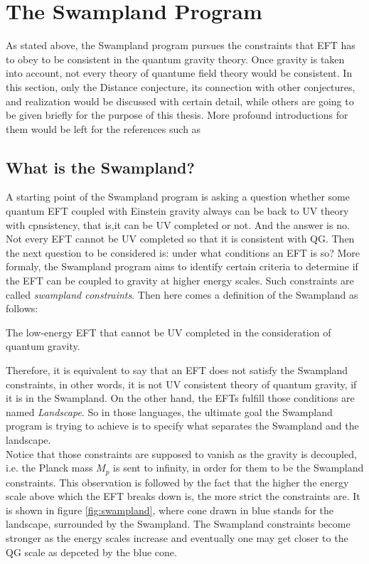 

\section{The Swampland Program}
As stated above, the Swampland program pursues the constraints that EFT has to obey to be consistent in the quantum gravity theory. Once gravity is taken into account, not every theory of quantume field theory would be consistent. In this section, only the Distance conjecture, its connection with other conjectures, and realization would be discussed with certain detail, while others are going to be given briefly for the purpose of this thesis. More profound introductions for them would be left for the references such as %

\subsection{What is the Swampland?}
A starting point of the Swampland program is asking a question whether some quantum EFT coupled with Einstein gravity always can be back to UV theory with cpnsistency, that is,it can be UV completed or not. And the answer is no. Not every EFT cannot be UV completed so that it is consistent with QG. Then the next question to be considered is: under what conditions an EFT is so? More formaly, the Swampland program aims to identify certain criteria to determine if the EFT can be coupled to gravity at higher energy scales. Such constraints are called \emph{swampland constraints}. Then here comes a definition of the Swampland as follows:
\begin{tcolorbox}[title=The Swampland,
    title filled=false,
    colback=blue!5!white,
    colframe=blue!75!black]
    The low-energy EFT that cannot be UV completed in the consideration of quantum gravity.  %
\end{tcolorbox} 
Therefore, it is equivalent to say that an EFT does not satisfy the Swampland constraints, in other words, it is not UV consistent theory of quantum gravity, if it is in the Swampland. On the other hand, the EFTs fulfill those conditions are named \emph{Landscape}. So in those languages, the ultimate goal the Swampland program is trying to achieve is to specify what separates the Swampland and the landscape. \\
\indent Notice that those constraints are supposed to vanish as the gravity is decoupled, i.e. the Planck mass $M_{p}$ is sent to infinity, in order for them to be the Swampland constraints. This observation is followed by the fact that the higher the energy scale above which the EFT breaks down is, the more strict the constraints are. It is shown in figure \ref{fig:swampland}, where cone drawn in blue stands for the landscape, surrounded by the Swampland. The Swampland constraints become stronger as the energy scales increase and eventually one may get closer to the QG scale as depceted by the blue cone. \\ 

